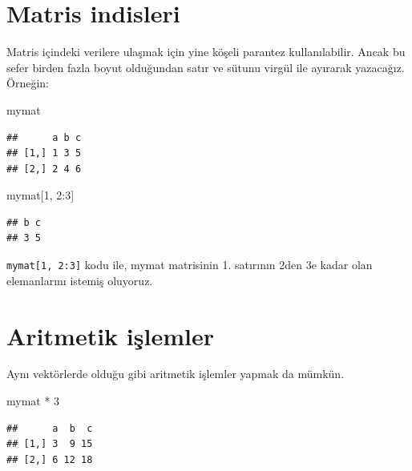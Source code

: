 \documentclass[
]{book}
\newenvironment{Shaded}{\begin{snugshade}}{\end{snugshade}}
\newcommand{\DecValTok}[1]{\textcolor[rgb]{0.00,0.00,0.81}{#1}}
\newcommand{\NormalTok}[1]{#1}
\newcommand{\SpecialCharTok}[1]{\textcolor[rgb]{0.00,0.00,0.00}{#1}}
\begin{document}
\hypertarget{matris-indisleri}{%
\section{Matris indisleri}\label{matris-indisleri}}

Matris içindeki verilere ulaşmak için yine köşeli parantez kullanılabilir. Ancak bu sefer birden fazla boyut olduğundan satır ve sütunu virgül ile ayırarak yazacağız. Örneğin:

\begin{Shaded}
\begin{Highlighting}[]
\NormalTok{mymat}
\end{Highlighting}
\end{Shaded}

\begin{verbatim}
##      a b c
## [1,] 1 3 5
## [2,] 2 4 6
\end{verbatim}

\begin{Shaded}
\begin{Highlighting}[]
\NormalTok{mymat[}\DecValTok{1}\NormalTok{, }\DecValTok{2}\SpecialCharTok{:}\DecValTok{3}\NormalTok{]}
\end{Highlighting}
\end{Shaded}

\begin{verbatim}
## b c 
## 3 5
\end{verbatim}

\texttt{mymat{[}1,\ 2:3{]}} kodu ile, mymat matrisinin 1. satırının 2den 3e kadar olan elemanlarını istemiş oluyoruz.

\hypertarget{aritmetik-iux15flemler}{%
\section{Aritmetik işlemler}\label{aritmetik-iux15flemler}}

Aynı vektörlerde olduğu gibi aritmetik işlemler yapmak da mümkün.

\begin{Shaded}
\begin{Highlighting}[]
\NormalTok{mymat }\SpecialCharTok{*} \DecValTok{3}
\end{Highlighting}
\end{Shaded}

\begin{verbatim}
##      a  b  c
## [1,] 3  9 15
## [2,] 6 12 18
\end{verbatim}
\end{document}
